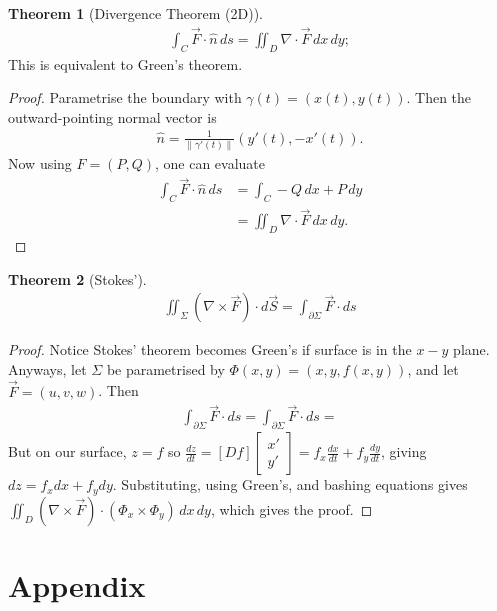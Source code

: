 \documentclass{article}
\theoremstyle{definition}
\newtheorem{thm}{Theorem}[subsubsection]
\begin{document}
\begin{thm}[Divergence Theorem (2D)]
	\begin{align*}
		\int_C\vec F\cdot\hat{n}\,ds=\iint_D\nabla\cdot\vec F\,dx\,dy;
	\end{align*}
	This is equivalent to Green's theorem.
\end{thm}
\begin{proof}
	Parametrise the boundary with $\gamma(t)=\left(x(t),y(t)\right)$. Then the outward-pointing normal vector is
	\begin{align*}
		\hat{n}=\frac{1}{\lVert\gamma'(t)\rVert}(y'(t),-x'(t)).
	\end{align*}
	Now using $F=(P,Q)$, one can evaluate
	\begin{align*}
		\int_C\vec F\cdot\hat{n}\,ds&=\int_C-Q\,dx+P\,dy\\
		&=\iint_D\nabla\cdot\vec F\,dx\,dy.
	\end{align*}
\end{proof}

\begin{thm}[Stokes']
	\begin{align*}
		\iint_\Sigma(\nabla\times\vec F)\cdot d\vec S=\int_{\partial\Sigma}\vec F\cdot ds
	\end{align*}
\end{thm}
\begin{proof}
	Notice Stokes' theorem becomes Green's if surface is in the $x-y$ plane. 
	Anyways, let $\Sigma$ be parametrised by $\Phi(x,y)=(x,y,f(x,y))$, and let $\vec F=(u,v,w)$.
	Then
	\begin{align*}
		\int_{\partial \Sigma}\vec F\cdot ds=\int_{\partial \Sigma}\vec F\cdot ds=
	\end{align*}
	But on our surface, $z=f$ so $\frac{dz}{dt}=[Df]\begin{bmatrix}x'\\y'\end{bmatrix}=f_x\frac{dx}{dt}+f_y\frac{dy}{dt}$, giving $dz=f_xdx+f_ydy$. Substituting, using Green's, and bashing equations gives $\iint_D(\nabla\times\vec F)\cdot(\Phi_x\times\Phi_y)\,dx\,dy$, which gives the proof.
\end{proof}

\newpage
\appendix
\section{Appendix}
\end{document}

